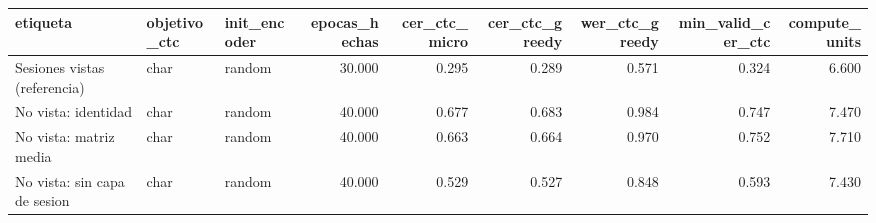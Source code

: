 \begin{tabular}{lllrrrrrr}
\toprule
etiqueta & objetivo_ctc & init_encoder & epocas_hechas & cer_ctc_micro & cer_ctc_greedy & wer_ctc_greedy & min_valid_cer_ctc & compute_units \\
\midrule
Sesiones vistas (referencia) & char & random & 30.000 & 0.295 & 0.289 & 0.571 & 0.324 & 6.600 \\
No vista: identidad & char & random & 40.000 & 0.677 & 0.683 & 0.984 & 0.747 & 7.470 \\
No vista: matriz media & char & random & 40.000 & 0.663 & 0.664 & 0.970 & 0.752 & 7.710 \\
No vista: sin capa de sesion & char & random & 40.000 & 0.529 & 0.527 & 0.848 & 0.593 & 7.430 \\
\bottomrule
\end{tabular}
